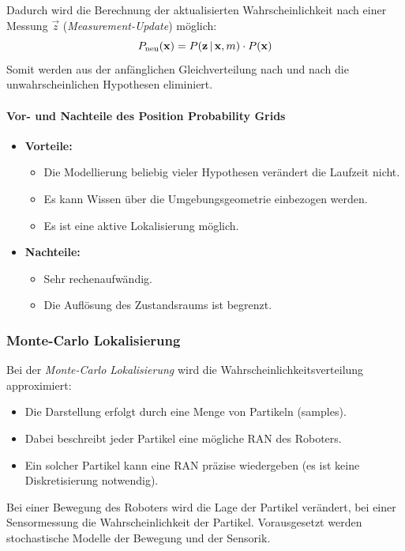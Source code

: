 					Dadurch wird die Berechnung der aktualisierten Wahrscheinlichkeit nach einer Messung \( \vec{z} \) (\emph{Measurement-Update}) möglich:
					\begin{equation*}
						P_\text{neu}(\boldsymbol{\mathrm{x}}) = P(\boldsymbol{\mathrm{z}} \,\vert\, \boldsymbol{\mathrm{x}}, m) \cdot P(\boldsymbol{\mathrm{x}})
					\end{equation*}
					Somit werden aus der anfänglichen Gleichverteilung nach und nach die unwahrscheinlichen Hypothesen eliminiert.
				
				\paragraph{Vor- und Nachteile des Position Probability Grids}
					\begin{itemize}
						\item \textbf{Vorteile:}
							\begin{itemize}
								\item Die Modellierung beliebig vieler Hypothesen verändert die Laufzeit nicht.
								\item Es kann Wissen über die Umgebungsgeometrie einbezogen werden.
								\item Es ist eine aktive Lokalisierung möglich.
							\end{itemize}
						\item \textbf{Nachteile:}
							\begin{itemize}
								\item Sehr rechenaufwändig.
								\item Die Auflösung des Zustandsraums ist begrenzt.
							\end{itemize}
					\end{itemize}

			\subsubsection{Monte-Carlo Lokalisierung}
				Bei der \emph{Monte-Carlo Lokalisierung} wird die Wahrscheinlichkeitsverteilung approximiert:
				\begin{itemize}
					\item Die Darstellung erfolgt durch eine Menge von Partikeln (samples).
					\item Dabei beschreibt jeder Partikel eine mögliche RAN des Roboters.
					\item Ein solcher Partikel kann eine RAN präzise wiedergeben (es ist keine Diskretisierung notwendig).
				\end{itemize}
				Bei einer Bewegung des Roboters wird die Lage der Partikel verändert, bei einer Sensormessung die Wahrscheinlichkeit der Partikel. Vorausgesetzt werden stochastische Modelle der Bewegung und der Sensorik.
				
